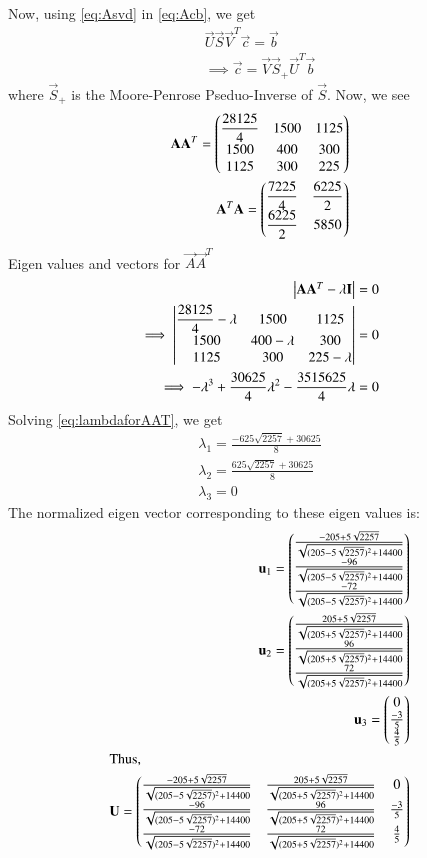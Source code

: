 \documentclass[journal,12pt,twocolumn]{IEEEtran}
\begin{document}
Now, using \eqref{eq:Asvd} in \eqref{eq:Acb}, we get
\begin{align}
    \vec{U}\vec{S}\vec{V}^T\vec{c} = \vec{b}\\
    \implies \vec{c} = \vec{V}\vec{S}_+\vec{U}^T\vec{b}\label{eq:Ccalculation}
\end{align}
where $\vec{S}_+$ is the Moore-Penrose Pseduo-Inverse of $\vec{S}$. Now, we see
\begin{align}
    \mathbf{A}\mathbf{A}^T = \begin{pmatrix}\dfrac{28125}{4} & 1500 & 1125 \\ 1500 & 400 & 300\\ 1125 & 300 & 225\end{pmatrix}\\
    \mathbf{A}^T\mathbf{A} = \begin{pmatrix}\dfrac{7225}{4} & \dfrac{6225}{2} \\ \dfrac{6225}{2} & 5850\end{pmatrix}
\end{align}
Eigen values and vectors for $\vec{A}\vec{A}^T$
\begin{align}
    \begin{vmatrix}\mathbf{A}\mathbf{A}^T - \lambda\mathbf{I}\end{vmatrix} = 0\\
    \implies \begin{vmatrix}\dfrac{28125}{4} - \lambda & 1500 & 1125 \\ 1500 & 400 - \lambda & 300\\ 1125 & 300 & 225 - \lambda\end{vmatrix} = 0\\
    \implies -\lambda^3 + \frac{30625}{4}\lambda^2 - \frac{3515625}{4}\lambda = 0\label{eq:lambdaforAAT}
\end{align}
Solving \eqref{eq:lambdaforAAT}, we get
\begin{align}
    \lambda_1 = \frac{-625\sqrt{2257} + 30625}{8}\\
    \lambda_2 = \frac{625\sqrt{2257} + 30625}{8}\\
    \lambda_3 = 0
\end{align}
The normalized eigen vector corresponding to these eigen values is:
\begin{align}
    \mathbf{u}_1 = \begin{pmatrix}\frac{-205 + 5\sqrt{2257}}{\sqrt{(205 - 5\sqrt{2257})^2 + 14400}}\\ \frac{-96}{\sqrt{(205 - 5\sqrt{2257})^2 + 14400}}\\\frac{-72}{\sqrt{(205 - 5\sqrt{2257})^2 + 14400}}\end{pmatrix}\\
    \mathbf{u}_2 = \begin{pmatrix}\frac{205 + 5\sqrt{2257}}{\sqrt{(205 + 5\sqrt{2257})^2 + 14400}}\\ \frac{96}{\sqrt{(205 + 5\sqrt{2257})^2 + 14400}}\\\frac{72}{\sqrt{(205 + 5\sqrt{2257})^2 + 14400}}\end{pmatrix}\\
    \mathbf{u}_3 = \begin{pmatrix}0 \\ \frac{-3}{5} \\ \frac{4}{5}\end{pmatrix}\\
    \intertext{Thus,}
    \mathbf{U} = \begin{pmatrix}\frac{-205 + 5\sqrt{2257}}{\sqrt{(205 - 5\sqrt{2257})^2 + 14400}} & \frac{205 + 5\sqrt{2257}}{\sqrt{(205 + 5\sqrt{2257})^2 + 14400}} & 0\\ \frac{-96}{\sqrt{(205 - 5\sqrt{2257})^2 + 14400}} & \frac{96}{\sqrt{(205 + 5\sqrt{2257})^2 + 14400}} & \frac{-3}{5} \\ \frac{-72}{\sqrt{(205 - 5\sqrt{2257})^2 + 14400}} & \frac{72}{\sqrt{(205 + 5\sqrt{2257})^2 + 14400}} & \frac{4}{5}\end{pmatrix}\label{eq:Uval}
\end{align}
\end{document}
